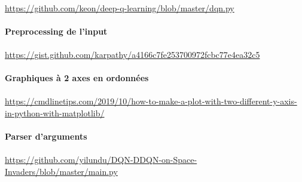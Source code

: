 \documentclass[12pt,oneside,a4paper]{article}
\begin{document}
    \paragraph{}
    \url{https://github.com/keon/deep-q-learning/blob/master/dqn.py}

    \paragraph{}
    \paragraph{Preprocessing de l'input} 
    \paragraph{}
    \url{https://gist.github.com/karpathy/a4166c7fe253700972fcbc77e4ea32c5}

    \paragraph{}
    \paragraph{Graphiques à 2 axes en ordonnées}
    \paragraph{}
    \url{https://cmdlinetips.com/2019/10/how-to-make-a-plot-with-two-different-y-axis-in-python-with-matplotlib/}
    \paragraph{}

    \paragraph{Parser d'arguments}
    \paragraph{}
    \url{https://github.com/yilundu/DQN-DDQN-on-Space-Invaders/blob/master/main.py}
\end{document}
